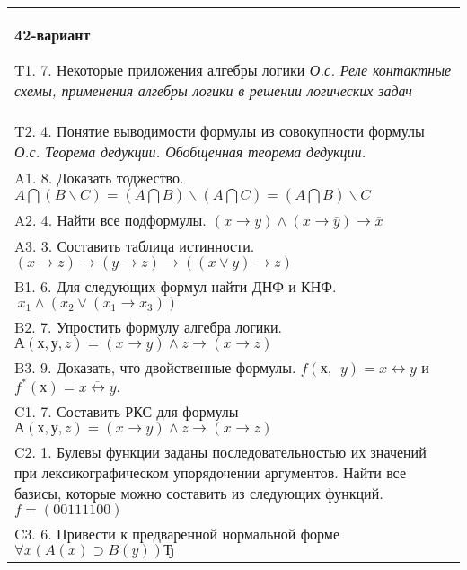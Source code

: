\documentclass{article}
\begin{document}
\begin{tabular}{m{17cm}}
\textbf{42-вариант}
\newline

T1. 7. Некоторые приложения алгебры логики \emph{О.с. Реле контактные схемы, применения алгебры логики в решении логических задач} \\
T2. 4. Понятие выводимости формулы из совокупности формулы \emph{О.с. Теорема дедукции. Обобщенная теорема дедукции.} \\
A1. 8. Доказать тоджество. \(A\bigcap(B\backslash C) = (A\bigcap B)\backslash(A\bigcap C) = (A\bigcap B)\backslash C\) \\
A2. 4. Найти все подформулы. \((x \rightarrow y) \land (x \rightarrow \overline{y}) \rightarrow \overline{x}\) \\
A3. 3. Составить таблица истинности. \((x \rightarrow z) \rightarrow (y \rightarrow z) \rightarrow ((x \vee y) \rightarrow z)\) \\
B1. 6. Для следующих формул найти ДНФ и КНФ. \(\ x_{1} \land (x_{2} \vee (x_{1} \rightarrow x_{3}))\) \\
B2. 7. Упростить формулу алгебра логики. \(А(х,у,z) = (x \rightarrow y) \land z \rightarrow (x \rightarrow z)\) \\
B3. 9. Доказать, что двойственные формулы. \(f(х,\ \ y) = x \leftrightarrow y\) и \(f^{*}(х) = \overline{x \leftrightarrow y}.\) \\
C1. 7. Составить РКС для формулы \(А(х,у,z) = (x \rightarrow y) \land z \rightarrow (x \rightarrow z)\) \\
C2. 1. Булевы функции заданы последовательностью их значений при лексикографическом упорядочении аргументов. Найти все базисы, которые можно составить из следующих функций.\(f = (00111100)\) \\
C3. 6. Привести к предваренной нормальной форме \(\forall x(A(x) \supset B(y))Ђ\) \\

\end{tabular}
\vspace{1cm}
\end{document}
